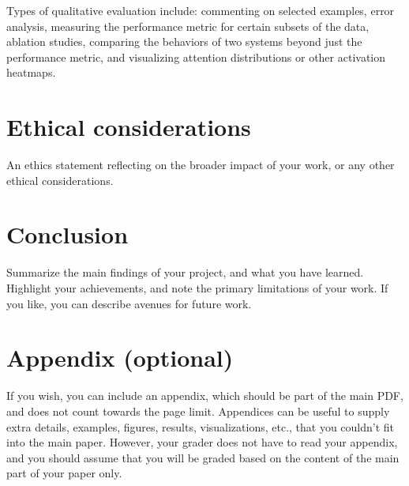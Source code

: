 \documentclass[11pt]{article}
\begin{document}
Types of qualitative evaluation include: commenting on selected examples, error analysis, measuring the performance metric for certain subsets of the data, ablation studies, comparing the behaviors of two systems beyond just the performance metric, and visualizing attention distributions or other activation heatmaps.


\section{Ethical considerations}
An ethics statement reflecting on the broader impact of your work, or any other ethical considerations.


\section{Conclusion}
Summarize the main findings of your project, and what you have learned. Highlight your achievements, and note the primary limitations of your work. If you like, you can describe avenues for future work.






\appendix

\section{Appendix (optional)}
If you wish, you can include an appendix, which should be part of the main PDF, and does not count towards the page limit. Appendices can be useful to supply extra details, examples, figures, results, visualizations, etc., that you couldn’t fit into the main paper. However, your grader does not have to read your appendix, and you should assume that you will be graded based on the content of the main part of your paper only.
\end{document}
